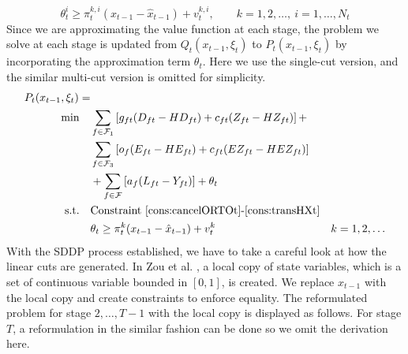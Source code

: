 \documentclass[12pt]{article}
\begin{document}
	\begin{equation}
		\theta_t^i \geq \pi_t^{k,i}(x_{t-1} - \hat{x}_{t-1}) + v_t^{k,i}, \qquad k = 1, 2, \dots,\ i = 1, \dots, N_t
	\end{equation}
	Since we are approximating the value function at each stage, the problem we solve at each stage is updated from \(Q_t(x_{t-1},\xi_t)\) to \(P_t(x_{t - 1}, \xi_t)\) by incorporating the approximation term \(\theta_t\). Here we use the single-cut version, and the similar multi-cut version is omitted for simplicity.
	\begin{subequations}
		\begin{align}
			P_t(x_{t-1},\xi_t) = & & \\
			\min \quad & \sum_{f \in \mathcal{F}_1} \left[ g_{ft} (D_{ft} - HD_{ft}) + c_{ft} (Z_{ft} - HZ_{ft}) \right]  + & \nonumber \\
			& \sum_{f \in \mathcal{F}_3} \left[ o_f(E_{ft} - HE_{ft}) + c_{ft}(EZ_{ft} - HEZ_{ft}) \right]& \nonumber\\ 
			& +\sum_{f \in \mathcal{F}} \left[ a_f (L_{ft} - Y_{ft})\right]  + \theta_t &\\
			\text{s.t.} \quad & \text{Constraint \eqref{cons:cancelORTOt}-\eqref{cons:transHXt}} & \\
			& \theta_t \geq \pi_t^k(x_{t-1} - \hat{x}_{t-1}) + v_t^k & k = 1, 2, \dots
		\end{align}
	\end{subequations}
	\noindent With the SDDP process established, we have to take a careful look at how the linear cuts are generated. In Zou et al. \cite{zou2016nested}, a local copy of state variables, which is a set of continuous variable bounded in \([0,1]\), is created. We replace \(x_{t-1}\) with the local copy and create constraints to enforce equality. The reformulated problem for stage \(2, \dots, T-1\) with the local copy is displayed as follows. For stage \(T\), a reformulation in the similar fashion can be done so we omit the derivation here.
\end{document}
